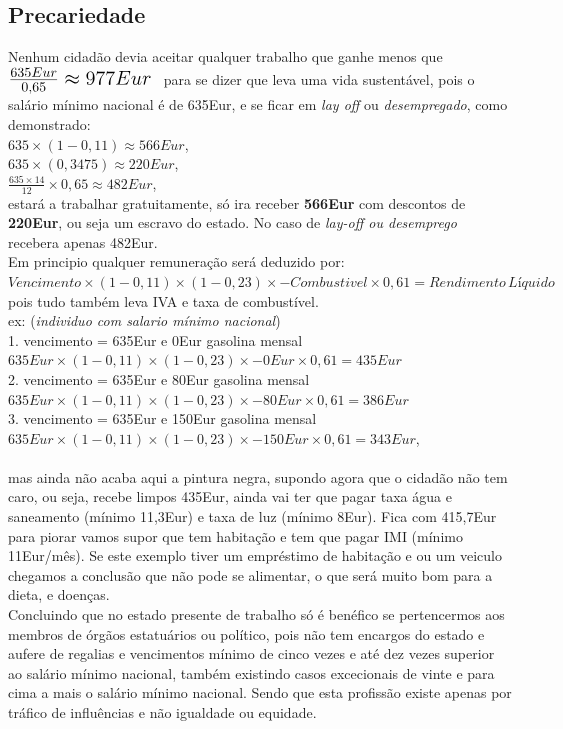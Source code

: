 \subsection{Precariedade}
\qquad Nenhum cidadão devia aceitar qualquer trabalho que ganhe menos que \; $ \mbox{\Large $ \frac{635Eur}{0,65}\approx 977Eur $ } $ para se dizer que leva uma vida sustentável, pois o salário mínimo nacional é de 635Eur, e se ficar em \textit{lay off} ou \textit{desempregado}, como demonstrado:\\
$635\times(1-0,11)\approx566Eur$,\\
$635\times(0,3475)\approx220Eur$,\\
$\frac{635\times14}{12}\times0,65 \approx 482Eur$, \\
estará a trabalhar gratuitamente, só ira receber \textbf{566Eur} com descontos de \textbf{220Eur}, ou seja um escravo do estado. No caso de \textit{lay-off ou desemprego} recebera apenas 482Eur.\\
Em principio qualquer remuneração será deduzido por: $Vencimento \times (1-0,11) \times (1-0,23) \times - Combustivel\times 0,61 = Rendimento \, Líquido$ pois tudo também leva IVA e taxa de combustível.\\
ex: (\textit{individuo com salario mínimo nacional})\\
1. vencimento = 635Eur e 0Eur gasolina mensal \\
\hspace*{1cm} $635Eur \times (1-0,11) \times (1-0,23) \times - 0Eur \times 0,61 = 435Eur$ \\
2. vencimento = 635Eur e 80Eur gasolina mensal \\
\hspace*{1cm} $635Eur \times (1-0,11) \times (1-0,23) \times - 80Eur \times 0,61 = 386Eur$ \\
3. vencimento = 635Eur e 150Eur gasolina mensal \\
\hspace*{1cm} $635Eur \times (1-0,11) \times (1-0,23) \times - 150Eur \times 0,61 = 343Eur$, \\ \\
mas ainda não acaba aqui a pintura negra, supondo agora que o cidadão não tem caro, ou seja, recebe limpos 435Eur, ainda vai ter que pagar taxa água e saneamento (mínimo 11,3Eur) e taxa de luz (mínimo 8Eur). Fica com 415,7Eur para piorar vamos supor que tem habitação e tem que pagar IMI (mínimo 11Eur/mês).
Se este exemplo tiver um empréstimo de habitação e ou um veiculo chegamos a conclusão que não pode se alimentar, o que será muito bom para a dieta, e doenças.\\
Concluindo que no estado presente de trabalho só é benéfico se pertencermos aos membros de órgãos estatuários ou político, pois não tem encargos do estado e aufere de regalias e vencimentos mínimo de cinco vezes e até dez vezes superior ao salário mínimo nacional, também existindo casos excecionais de vinte e para cima a mais o salário mínimo nacional. Sendo que esta profissão existe apenas por tráfico de influências e não igualdade ou equidade.

